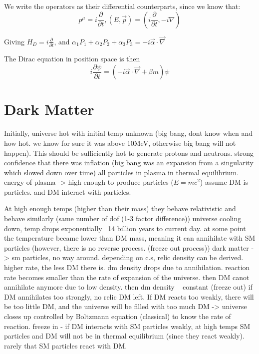 \documentclass[11pt,a4paper]{article}
\begin{document}
We write the operators as their differential counterparts, since we know that:
\begin{equation}
    p^\mu = i\frac{\partial}{\partial t}, 
    (E, \vec{p}) = (i\frac{\partial}{\partial t}, -i\nabla)
\end{equation}

Giving $H_D = i\frac{\partial}{\partial t}$, and $\alpha_1 P_1 + \alpha_2 P_2 + \alpha_3 P_3 = -i\vec{\alpha}\cdot\vec{\nabla}$

The Dirac equation in position space is then 
\begin{equation}
    i\frac{\partial\psi}{\partial t} = (-i\vec{\alpha}\cdot\vec{\nabla} + \beta m)\psi
\end{equation}
\section{Dark Matter}
Initially, universe hot with initial temp unknown (big bang, dont know when and how hot. we know for sure it was above 10MeV, otherwise big bang will not happen). This
should be sufficiently hot to generate protons and neutrons.
strong confidence that there was inflation (big bang was an expansion from a singularity which slowed down over time)
all particles in plasma in thermal equilibrium. energy of plasma -> high enough to produce particles ($E = mc^2$)
assume DM is particles. and DM interact with particles. 

At high enough temps (higher than their mass) they behave relativistic and behave similarly (same number of dof (1-3 factor difference))
universe cooling down, temp drops exponentially ~14 billion years to current day.
at some point the temperature became lower than DM mass, meaning it can annihilate with SM particles (however, there is no reverse process. (freeze out process))
dark matter -> sm particles, no way around. depending on c.s, relic density can be derived. higher rate, the less DM there is.
dm density drops due to annihilation. reaction rate becomes smaller than the rate of expansion of the universe. then DM canot annihilate anymore due to low density. then dm density ~ constant (freeze out)
if DM annihilates too strongly, no relic DM left. If DM reacts too weakly, there will be too little DM, and the universe will be filled with too much DM -> universe closes up
controlled by Boltzmann equation (classical) to know the rate of reaction. 
freeze in - if DM interacts with SM particles weakly, at high temps SM particles and DM will not be in thermal equilibrium (since they react weakly). rarely that SM particles react with DM. 
\end{document}
